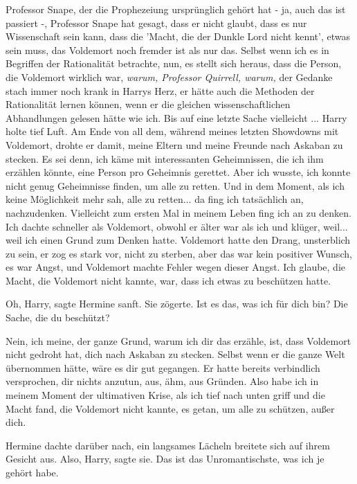 \glqq{}Professor Snape, der die Prophezeiung ursprünglich gehört hat - ja, auch
das ist passiert -, Professor Snape hat gesagt, dass er nicht glaubt, dass es
nur Wissenschaft sein kann, dass die 'Macht, die der Dunkle Lord nicht kennt',
etwas sein muss, das Voldemort noch fremder ist als nur das. Selbst wenn ich es
in Begriffen der Rationalität betrachte, nun, es stellt sich heraus, dass die
Person, die Voldemort wirklich war\grqq{}, \emph{warum, Professor Quirrell,
warum,} der Gedanke stach immer noch krank in Harrys Herz, \glqq{}er hätte auch
die Methoden der Rationalität lernen können, wenn er die gleichen
wissenschaftlichen Abhandlungen gelesen hätte wie ich. Bis auf eine letzte Sache
vielleicht ...\grqq{} Harry holte tief Luft. \glqq{}Am Ende von all dem, während meines
letzten Showdowns mit Voldemort, drohte er damit, meine Eltern und meine Freunde
nach Askaban zu stecken. Es sei denn, ich käme mit interessanten Geheimnissen,
die ich ihm erzählen könnte, eine Person pro Geheimnis gerettet. Aber ich
wusste, ich konnte nicht genug Geheimnisse finden, um alle zu retten. Und in dem
Moment, als ich keine Möglichkeit mehr sah, alle zu retten... da fing ich
tatsächlich an, nachzudenken. Vielleicht zum ersten Mal in meinem Leben fing ich
an zu denken. Ich dachte schneller als Voldemort, obwohl er älter war als ich
und klüger, weil... weil ich einen Grund zum Denken hatte. Voldemort hatte den
Drang, unsterblich zu sein, er zog es stark vor, nicht zu sterben, aber das war
kein positiver Wunsch, es war Angst, und Voldemort machte Fehler wegen dieser
Angst. Ich glaube, die Macht, die Voldemort nicht kannte, war, dass ich etwas zu
beschützen hatte.\grqq{}

\glqq{}Oh, Harry\grqq{}, sagte Hermine sanft. Sie zögerte. \glqq{}Ist es das, was
ich für dich bin? Die Sache, die du beschützt?\grqq{}

\glqq{}Nein, ich meine, der ganze Grund, warum ich dir das erzähle, ist, dass
Voldemort nicht gedroht hat, dich nach Askaban zu stecken. Selbst wenn er die
ganze Welt übernommen hätte, wäre es dir gut gegangen. Er hatte bereits
verbindlich versprochen, dir nichts anzutun, aus, ähm, aus Gründen. Also habe
ich in meinem Moment der ultimativen Krise, als ich tief nach unten griff und
die Macht fand, die Voldemort nicht kannte, es getan, um alle zu schützen, außer
dich.\grqq{}

Hermine dachte darüber nach, ein langsames Lächeln breitete sich auf ihrem
Gesicht aus. \glqq{}Also, Harry\grqq{}, sagte sie. \glqq{}Das ist das
Unromantischste, was ich je gehört habe.\grqq{}

